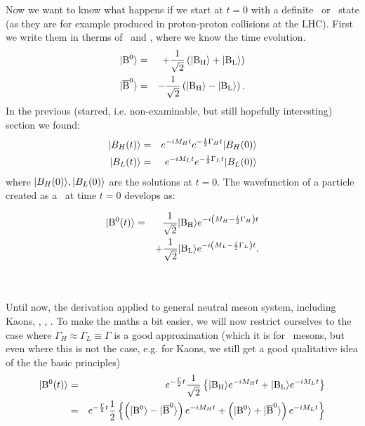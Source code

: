 Now we want to know what happens if we start at $t=0$ with a definite \Bo\ or \Bob\ state (as they are for example produced in proton-proton collisions at the LHC).
First we write them in therms of \Bh\ and \Bl, where we know the time evolution.
\begin{eqnarray}
 | {\rm B^0} \rangle &=&  + \frac{1}{\sqrt{2}} \left( | {\rm B_{H}} \rangle +  | {\rm B_{L}} \rangle\right)\nonumber\\
 | {\rm \overline{B}^0} \rangle&=&  - \frac{1}{\sqrt{2}} \left( | {\rm B_{H}} \rangle -   | {\rm B_{L}} \rangle\right)
.
\end{eqnarray}
%
In the previous (starred, i.e. non-examinable, but still hopefully interesting) section we found:
 \begin{eqnarray}
  | B_H(t) \rangle &=& e^{-iM_Ht} e^{-\frac{1}{2}\Gamma_Ht}  | B_H(0) \rangle \nonumber\\
  | B_L(t) \rangle &=& e^{-iM_Lt} e^{-\frac{1}{2}\Gamma_Lt}  | B_L(0) \rangle 
 \end{eqnarray}
 where $ | B_H(0) \rangle,  | B_L(0) \rangle$ are the solutions at $t=0$.
%
 The wavefunction of a particle created as a \Bo\ at time $t=0$
 develops as:\\
\newcommand{\expheavy}{e^{-i\left(M_H -\frac{i}{2}\Gamma_H \right) t}}
\newcommand{\explight}{e^{-i\left(M_L -\frac{i}{2}\Gamma_L \right) t}}
\newcommand{\expmh}{e^{-i M_H t}}
\newcommand{\expml}{e^{-i M_L t}}
\newcommand{\expthalf}{e^{-\frac{\Gamma}{2}t}}
%
\parbox{0.97\columnwidth}{
\begin{eqnarray}
%
\ket{\Bo(t)}&=&   \frac{1}{\sqrt{2}}\ket{\Bh}\expheavy \nonumber\\
            & & + \frac{1}{\sqrt{2}}\ket{\Bl}\explight 
.
\nonumber\\
\mbox{}
%
\end{eqnarray}}\\
 Until now, the derivation applied to general neutral meson system,
 including Kaons, \prt{\Do}, , \prt{\Bo}. To make the maths a bit easier, we will now restrict ourselves to the case where $\Gamma_H \approx \Gamma_L \equiv \Gamma$ is a
 good approximation (which it is for \Bo\ mesons, but even where this is not the case, e.g. for Kaons, we still get a good qualitative idea of the the basic principles)\\
\begin{eqnarray}
%
\ket{\Bo(t)} &=&\expthalf \frac{1}{\sqrt{2}} \left\{ \ket{\Bh}\expmh + \ket{\Bl}\expml \right\}
\nonumber \\
 &=& 
\expthalf \frac{1}{2} 
     \left\{ \left( \ket{\Bo}-\ket{\Bob} \right) \expmh
           + \left( \ket{\Bo}+\ket{\Bob} \right) \expml \right\}
\end{eqnarray}
